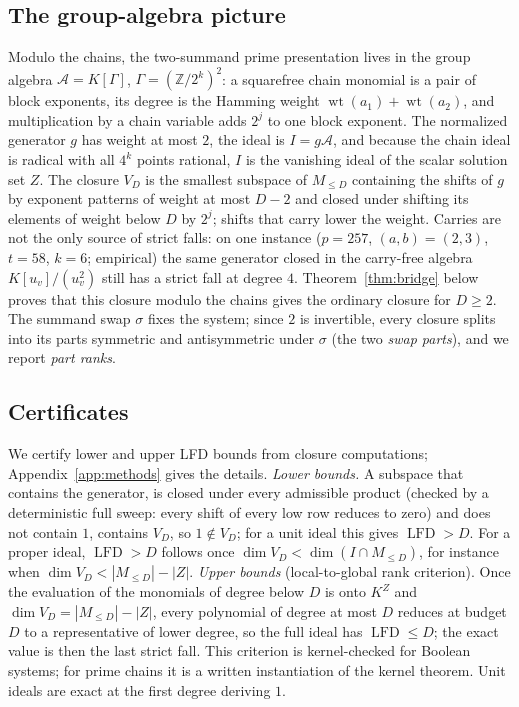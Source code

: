 \documentclass[11pt]{article}
\theoremstyle{definition}\newtheorem{definition}[theorem]{Definition}
\theoremstyle{remark}\newtheorem{remark}[theorem]{Remark}
\newcommand{\lfd}{\operatorname{LFD}}
\newcommand{\wt}{\operatorname{wt}}
\begin{document}
\subsection{The group-algebra picture}\label{sec:groupalgebra}
Modulo the chains, the two-summand prime presentation lives in the group
algebra $\mathcal A=K[\Gamma]$, $\Gamma=(\mathbb Z/2^k)^2$: a squarefree chain monomial is a
pair of block exponents, its degree is the Hamming weight
$\wt(a_1)+\wt(a_2)$, and multiplication by a chain variable adds $2^j$ to
one block exponent. The normalized generator $g$ has weight at most $2$, the
ideal is $I=g\mathcal A$, and because the chain ideal is radical with all $4^k$
points rational, $I$ is the vanishing ideal of the scalar solution set $Z$.
The closure $V_D$ is the smallest subspace of $M_{\le D}$ containing the
shifts of $g$ by exponent patterns of weight at most $D-2$ and closed under
shifting its elements of weight below $D$ by $2^j$; shifts that carry lower
the weight. Carries are not the only source of strict falls: on one
instance ($p=257$, $(a,b)=(2,3)$, $t=58$, $k=6$; empirical) the same
generator closed in the carry-free algebra $K[u_v]/(u_v^2)$ still has a
strict fall at degree $4$. Theorem~\ref{thm:bridge} below proves that this closure modulo
the chains gives the ordinary closure for $D\ge2$. The summand swap
$\sigma$ fixes the system; since $2$ is invertible, every closure splits
into its parts symmetric and antisymmetric under $\sigma$ (the two
\emph{swap parts}), and we report \emph{part ranks}.

\subsection{Certificates}\label{sec:certs}
We certify lower and upper LFD bounds from closure computations; Appendix~\ref{app:methods} gives the details.
\emph{Lower bounds.} A subspace that contains the generator, is closed under
every admissible product (checked by a deterministic full sweep: every shift
of every low row reduces to zero) and does not contain $1$, contains $V_D$,
so $1\notin V_D$; for a unit ideal this gives $\lfd>D$. For a proper ideal,
$\lfd>D$ follows once $\dim V_D<\dim(I\cap M_{\le D})$, for instance when
$\dim V_D<|M_{\le D}|-|Z|$.
\emph{Upper bounds} (local-to-global rank criterion). Once the evaluation of
the monomials of degree below $D$ is onto $K^Z$ and $\dim V_D=|M_{\le
D}|-|Z|$, every polynomial of degree at most $D$ reduces at budget $D$ to a
representative of lower degree, so the full ideal has $\lfd\le D$; the
exact value is then the last strict fall. This criterion is kernel-checked
for Boolean systems; for prime chains it is a written instantiation of the
kernel theorem. Unit ideals are exact at the first degree deriving $1$.
\end{document}
